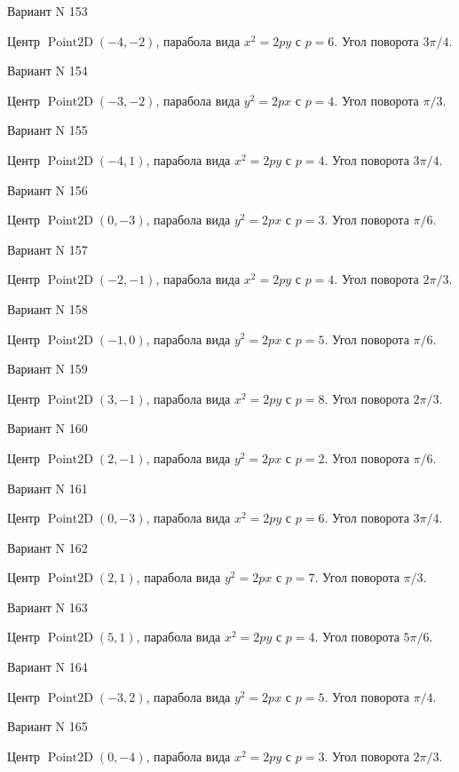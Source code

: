 \documentclass[11pt]{report}
\begin{document}
Вариант N 153

Центр $\operatorname{Point2D}\left(-4, -2\right)$, парабола вида $x^{2} = 2py$ с $p = 6$. Угол поворота $3 \pi / 4$.

Вариант N 154

Центр $\operatorname{Point2D}\left(-3, -2\right)$, парабола вида $y^{2} = 2px$ с $p = 4$. Угол поворота $\pi / 3$.

Вариант N 155

Центр $\operatorname{Point2D}\left(-4, 1\right)$, парабола вида $x^{2} = 2py$ с $p = 4$. Угол поворота $3 \pi / 4$.

Вариант N 156

Центр $\operatorname{Point2D}\left(0, -3\right)$, парабола вида $y^{2} = 2px$ с $p = 3$. Угол поворота $\pi / 6$.

Вариант N 157

Центр $\operatorname{Point2D}\left(-2, -1\right)$, парабола вида $x^{2} = 2py$ с $p = 4$. Угол поворота $2 \pi / 3$.

Вариант N 158

Центр $\operatorname{Point2D}\left(-1, 0\right)$, парабола вида $y^{2} = 2px$ с $p = 5$. Угол поворота $\pi / 6$.

Вариант N 159

Центр $\operatorname{Point2D}\left(3, -1\right)$, парабола вида $x^{2} = 2py$ с $p = 8$. Угол поворота $2 \pi / 3$.

Вариант N 160

Центр $\operatorname{Point2D}\left(2, -1\right)$, парабола вида $y^{2} = 2px$ с $p = 2$. Угол поворота $\pi / 6$.

Вариант N 161

Центр $\operatorname{Point2D}\left(0, -3\right)$, парабола вида $x^{2} = 2py$ с $p = 6$. Угол поворота $3 \pi / 4$.

Вариант N 162

Центр $\operatorname{Point2D}\left(2, 1\right)$, парабола вида $y^{2} = 2px$ с $p = 7$. Угол поворота $\pi / 3$.

Вариант N 163

Центр $\operatorname{Point2D}\left(5, 1\right)$, парабола вида $x^{2} = 2py$ с $p = 4$. Угол поворота $5 \pi / 6$.

Вариант N 164

Центр $\operatorname{Point2D}\left(-3, 2\right)$, парабола вида $y^{2} = 2px$ с $p = 5$. Угол поворота $\pi / 4$.

Вариант N 165

Центр $\operatorname{Point2D}\left(0, -4\right)$, парабола вида $x^{2} = 2py$ с $p = 3$. Угол поворота $2 \pi / 3$.
\end{document}
